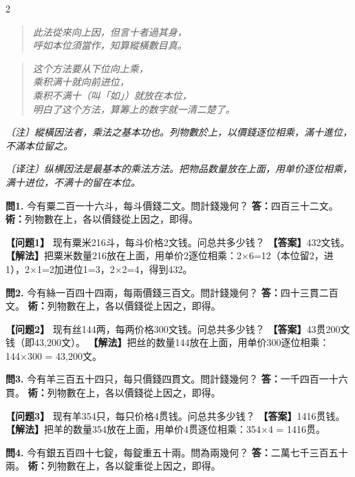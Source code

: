 \documentclass[11pt,a4paper]{article}
\newcommand{\rhymeCL}[1]{%
  \begin{quote}\itshape\color{verselinecolor}#1\end{quote}
}
\newcommand{\rhymeMOD}[1]{%
  \begin{quote}\itshape\color{verselinecolor}#1\end{quote}
}
\newcommand{\noteCL}[1]{\par\textcolor{notecolor}{\small\textit{〔注〕#1}}\par\smallskip}
\newcommand{\noteMOD}[1]{\par\textcolor{notecolor}{\small\textit{〔译注〕#1}}\par\smallskip}
\begin{document}
\begin{paracol}{2}
\rhymeCL{此法從來向上因，但言十者過其身，\\
呼如本位須當作，知算縱橫數目真。}
\switchcolumn
\rhymeMOD{这个方法要从下位向上乘，\\
乘积满十就向前进位，\\
乘积不满十（叫「如」）就放在本位，\\
明白了这个方法，算筹上的数字就一清二楚了。}
\switchcolumn*
\noteCL{縱橫因法者，乘法之基本功也。列物數於上，以價錢逐位相乘，滿十進位，不滿本位留之。}
\switchcolumn
\noteMOD{纵横因法是最基本的乘法方法。把物品数量放在上面，用单价逐位相乘，满十进位，不满十的留在本位。}

\switchcolumn*

\textbf{問1.} 今有粟二百一十六斗，每斗價錢二文。問計錢幾何？\break
\textbf{答：}四百三十二文。\break
\textbf{術：}列物數在上，各以價錢從上因之，即得。

\switchcolumn

\textbf{【问题1】} 现有粟米216斗，每斗价格2文钱。问总共多少钱？\break
\textbf{【答案】}432文钱。\break
\textbf{【解法】}把粟米数量216放在上面，用单价2逐位相乘：2×6=12（本位留2，进1），2×1=2加进位1=3，2×2=4，得到432。

\switchcolumn*

\textbf{問2.} 今有絲一百四十四兩，每兩價錢三百文。問計錢幾何？\break
\textbf{答：}四十三貫二百文。\break
\textbf{術：}列物數在上，各以價錢從上因之，即得。

\switchcolumn

\textbf{【问题2】} 现有丝144两，每两价格300文钱。问总共多少钱？\break
\textbf{【答案】}43贯200文钱（即43,200文）。\break
\textbf{【解法】}把丝的数量144放在上面，用单价300逐位相乘：144×300 = 43,200文。

\switchcolumn*

\textbf{問3.} 今有羊三百五十四只，每只價錢四貫文。問計錢幾何？\break
\textbf{答：}一千四百一十六貫。\break
\textbf{術：}列物數在上，各以價錢從上因之，即得。

\switchcolumn

\textbf{【问题3】} 现有羊354只，每只价格4贯钱。问总共多少钱？\break
\textbf{【答案】}1416贯钱。\break
\textbf{【解法】}把羊的数量354放在上面，用单价4贯逐位相乘：354×4 = 1416贯。

\switchcolumn*

\textbf{問4.} 今有銀五百四十七錠，每錠重五十兩。問為兩幾何？\break
\textbf{答：}二萬七千三百五十兩。\break
\textbf{術：}列物數在上，各以錠重從上因之，即得。


\end{paracol}
\end{document}

